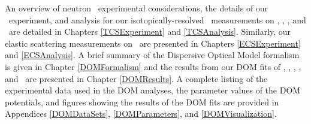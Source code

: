 An overview of neutron \tot\ experimental considerations, the details of our 
\tot\ experiment, and analysis for our isotopically-resolved \tot\ measurements
on \oSixEight, \niEightFour, \rhThree, and \snTwelveFour\ are detailed in 
Chapters \ref{TCSExperiment} and \ref{TCSAnalysis}. Similarly, our elastic scattering measurements 
on \snTwelveFour\ are presented in Chapters \ref{ECSExperiment} and \ref{ECSAnalysis}. A brief 
summary of the Dispersive Optical Model formalism is
given in Chapter \ref{DOMFormalism} and the results from our DOM fits of \oSixEight, 
\caAughtEight, \niEightFour, \snTwelveFour, and \pbEight\ are presented in Chapter \ref{DOMResults}. 
A complete listing of the experimental data used in the DOM analyses, the
parameter values of the DOM potentials, and figures showing the 
results of the DOM fits are provided in Appendices \ref{DOMDataSets},
\ref{DOMParameters}, and \ref{DOMVisualization}. 
